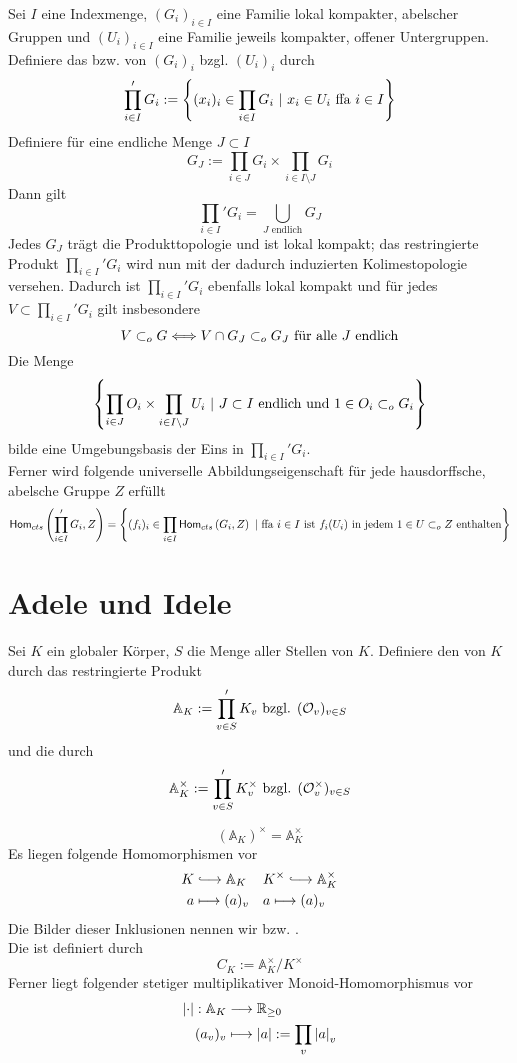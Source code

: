 \documentclass{book}
\renewcommand{\A}{\mathbb{A}}
\begin{document}
Sei $I$ eine Indexmenge, $(G_i)_{i\in I}$ eine Familie lokal kompakter, abelscher Gruppen und $(U_i)_{i\in I}$ eine Familie jeweils kompakter, offener Untergruppen.\\
Definiere das  bzw.  von $(G_i)_i$ bzgl. $(U_i)_i$ durch
\[ \prod_{i\in I}'G_i := \set{(x_i)_i \in \prod_{i\in I}G_i}{ x_i \in U_i \text{ ffa } i \in I } \]
Definiere für eine endliche Menge $J \subset I$
\[ G_J := \prod_{i \in J}G_i \times \prod_{i \in I\setminus J} G_i \]
Dann gilt
\[ \prod_{i\in I}'G_i = \bigcup_{J \text{ endlich}}G_J  \]
Jedes $G_J$ trägt die Produkttopologie und ist lokal kompakt; das restringierte Produkt $\prod_{i\in I}'G_i$ wird nun mit der dadurch induzierten Kolimestopologie versehen. Dadurch ist $\prod_{i\in I}'G_i$ ebenfalls lokal kompakt und für jedes $V \subset \prod_{i\in I}'G_i$ gilt insbesondere
\[ V \subset_o G \overset{}{\Longleftrightarrow} V\cap G_J \subset_o G_J \text{ für alle }J \text{ endlich} \]
Die Menge
\[ \set{ \prod_{i \in J}O_i \times \prod_{i \in I\setminus J}U_i }{J \subset I \text{ endlich und } 1 \in O_i \subset_o G_i} \]
bilde eine Umgebungsbasis der Eins in $\prod_{i\in I}'G_i$.\\
Ferner wird folgende universelle Abbildungseigenschaft für jede hausdorffsche, abelsche Gruppe $Z$ erfüllt
\[ \Hom{cts}{\prod_{i\in I}'G_i}{Z} = \set{(f_i)_i \in \prod_{i \in I} \Hom{cts}{G_i}{Z} }{ \text{ffa } i \in I \text{ ist } f_i(U_i) \text{ in jedem }1 \in U\subset_o Z \text{ enthalten} } \]


\section{Adele und Idele}
Sei $K$ ein globaler Körper, $S$ die Menge aller Stellen von $K$. Definiere den  von $K$ durch das restringierte Produkt
\[ \A_K := \prod'_{v\in S} K_v \text{ bzgl. } (\O_v)_{v\in S} \]
und die  durch
\[ \A_K^\times := \prod'_{v\in S}K_v^\times \text{ bzgl. } (\O_v^\times)_{v\in S} \]

\Bem{}
\[(\A_K)^\times = \A_K^\times \]
Es liegen folgende Homomorphismen vor
\begin{align*}
K & \Inj{} \A_K && K^\times \Inj{} \A_K^\times\\
a & \longmapsto (a)_v && a\longmapsto (a)_v
\end{align*}
Die Bilder dieser Inklusionen nennen wir  bzw. .\\
Die  ist definiert durch
\[ C_K := \A_K^\times / K^\times \]
Ferner liegt folgender stetiger multiplikativer Monoid-Homomorphismus vor
\begin{align*}
\bet{\cdot} : \A_K &\Pfeil{} \R_{\geq 0}\\
(a_v)_v & \longmapsto \bet{a} := \prod_{v}\bet{a}_v
\end{align*}
\end{document}
